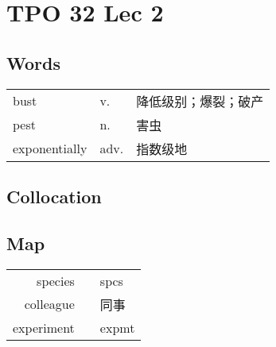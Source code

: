 \section{TPO 32 Lec 2}

\subsection{Words}

\begin{tabular}{lll}
    bust          & v.   & 降低级别；爆裂；破产 \\
    pest          & n.   & 害虫         \\
    exponentially & adv. & 指数级地       \\
\end{tabular}

\subsection{Collocation}

\subsection{Map}

\begin{tabular}{rc@{\quad$\to$\quad}l}
    species    &  & spcs  \\
    colleague  &  & 同事    \\
    experiment &  & expmt \\
\end{tabular}

\newpage
